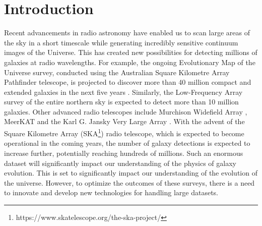 \documentclass[
  journal=pasa,
  manuscript=research-paper, %
  year=2020,
  volume=37,
]{cup-journal}
\begin{document}
\section{Introduction}
\label{SEC:Intro}
Recent advancements in radio astronomy have enabled us to scan large areas of the sky in a short timescale while generating incredibly sensitive continuum images of the Universe.
This has created new possibilities for detecting millions of galaxies at radio wavelengths. 
For example, the ongoing Evolutionary Map of the Universe \citep[EMU;][]{norris21} survey, conducted using the Australian Square Kilometre Array Pathfinder \citep[ASKAP;][]{johnston07ASKAP,DeBoer09,hotan21} telescope, is projected to discover more than 40 million compact and extended galaxies in the next five years \citep{norris21}. 
Similarly, the Low-Frequency Array \citep[LOFAR;][]{vanharleem13} survey of the entire northern sky is expected to detect more than 10 million galaxies.
Other advanced radio telescopes include Murchison Widefield Array \citep[MWA;][]{wayth18}, MeerKAT \citep{jonas16} and the Karl G. Jansky Very Large Array \citep[JVLA][]{perley11}.
With the advent of the Square Kilometre Array (SKA\footnote{https://www.skatelescope.org/the-ska-project/}) radio telescope, which is expected to become operational in the coming years, the number of galaxy detections is expected to increase further, potentially reaching hundreds of millions.
Such an enormous dataset will significantly impact our understanding of the physics of galaxy evolution. 
This is set to significantly impact our understanding of the evolution of the universe.
However, to optimize the outcomes of these surveys, there is a need to innovate and develop new technologies for handling large datasets.
\end{document}
